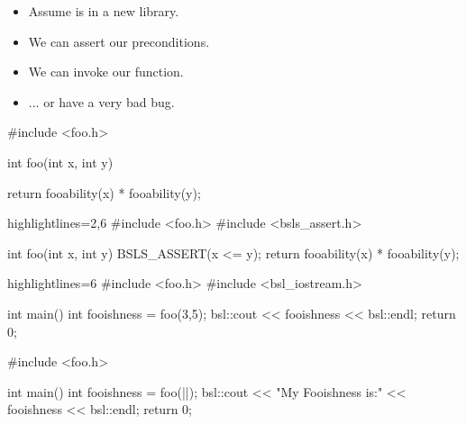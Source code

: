\begin{frame}[fragile]
\begin{overprint}
  \begin{itemize}
  \item<1->{Assume  is in a new library.}
  \item<2->{We can assert our preconditions.}
  \item<3->{We can invoke our function.}
  \item<4->{... or have a very bad bug.}
  \end{itemize}
\end{overprint}

\begin{overprint}
\begin{cppcodebox}
#include <foo.h>
  

int foo(int x, int y)
{

  return fooability(x) * fooability(y);
}  
\end{cppcodebox}

\begin{cppcodebox*}{highlightlines={2,6}}
#include <foo.h>
#include <bsls\_assert.h>
  
int foo(int x, int y)
{
  BSLS_ASSERT(x <= y);
  return fooability(x) * fooability(y);
}  
\end{cppcodebox*}

\begin{cppcodebox*}{highlightlines={6}}
#include <foo.h>
#include <bsl\_iostream.h>
  
int main()
{
  int fooishness = foo(3,5);
  bsl::cout << fooishness << bsl::endl;
  return 0;
}
\end{cppcodebox*}

\begin{cppcodebox}
#include <foo.h>

int main()
{
  int fooishness = foo(||);
  bsl::cout << "My Fooishness is:" << fooishness << bsl::endl;
  return 0;
}
\end{cppcodebox}

\end{overprint}
\end{frame}

